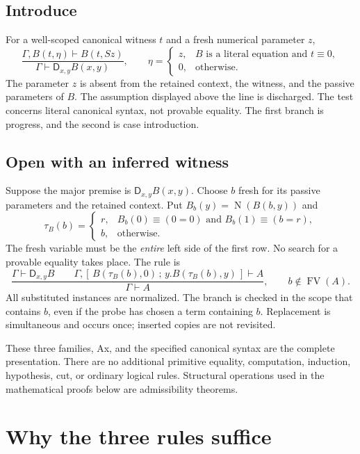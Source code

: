 \documentclass[11pt]{article}
\theoremstyle{definition}
\theoremstyle{remark}
\newcommand{\D}{\mathsf D}
\newcommand{\NF}{\operatorname{N}}
\newcommand{\FV}{\operatorname{FV}}
\newcommand{\der}{\vdash}
\newcommand{\cl}[2]{[\,#1\,;\,#2\,]}
\begin{document}
\subsection{Introduce}

For a well-scoped canonical witness $t$ and a fresh numerical
parameter $z$,
\[
 \frac{\Gamma,B(t,\eta)\der B(t,Sz)}
      {\Gamma\der\D_{x,y}B(x,y)},\qquad
 \eta=
 \begin{cases}
 z,&B\text{ is a literal equation and }t\equiv0,\\
 0,&\text{otherwise}.
 \end{cases}
 \tag{Intro}
\]
The parameter $z$ is absent from the retained context, the
witness, and the passive parameters of $B$.
The assumption displayed above the line is discharged.
The test concerns literal canonical syntax, not provable
equality. The first branch is progress, and the second is
case introduction.

\subsection{Open with an inferred witness}

Suppose the major premise is $\D_{x,y}B(x,y)$.
Choose $b$ fresh for its passive parameters and the retained
context. Put $B_b(y)=\NF(B(b,y))$ and
\[
 \tau_B(b)=
 \begin{cases}
 r,& B_b(0)\equiv(0=0)
       \text{ and } B_b(1)\equiv(b=r),\\
 b,&\text{otherwise}.
 \end{cases}                                                \tag{Probe}
\]
The fresh variable must be the \emph{entire} left side of
the first row. No search for a provable equality takes place.
The rule is
\[
 \frac{\Gamma\der\D_{x,y}B
       \qquad
       \Gamma,\cl{B(\tau_B(b),0)}{y.B(\tau_B(b),y)}
                \der A}
      {\Gamma\der A},
 \qquad b\notin\FV(A).
 \tag{Open}
\]
All substituted instances are normalized. The branch is
checked in the scope that contains $b$, even if the probe
has chosen a term containing $b$. Replacement is simultaneous
and occurs once; inserted copies are not revisited.

These three families, Ax, and the specified canonical
syntax are the complete presentation. There are no additional
primitive equality, computation, induction, hypothesis,
cut, or ordinary logical rules. Structural operations used
in the mathematical proofs below are admissibility theorems.

\section{Why the three rules suffice}
\label{sec:logicproof}
\end{document}
